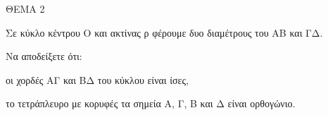 
ΘΕΜΑ 2

Σε κύκλο κέντρου Ο και ακτίνας ρ φέρουμε δυο διαμέτρους του ΑΒ και ΓΔ.

Να αποδείξετε ότι:

\begin{alist}
\item οι χορδές ΑΓ και ΒΔ του κύκλου είναι ίσες, 

\item το τετράπλευρο με κορυφές τα σημεία Α, Γ, Β και Δ είναι ορθογώνιο. 
\end{alist}
